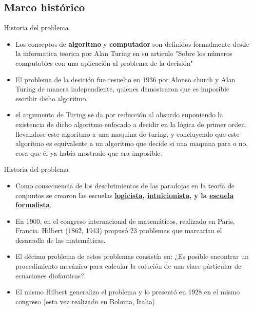 \documentclass{beamer}
\begin{document}
\subsection{Marco histórico}
\begin{frame}{Historia del problema}
    \begin{itemize}
        \item Los conceptos de \textbf{algoritmo} y \textbf{computador} son definidos formalmente desde la informatica teorica por Alan Turing en su articulo "Sobre los números computables con una aplicación al problema de la decisión"\pause
        \item El problema de la desición fue resuelto en 1936 por Alonso church y Alan Turing de manera independiente, quienes demostraron que es imposible escribir dicho algoritmo.\pause
        \item el argumento de Turing se da por reducción al absurdo suponiendo la existencia de dicho algoritmo enfocado a decidir en la lógica de primer orden. llevandose este algoritmo a una maquina de turing, y concluyendo que este algoritmo es equivalente a un algoritmo que decide si una maquina para o no, cosa que él ya había mostrado que era imposible.
    \end{itemize}
\end{frame}
\begin{frame}{Historia del problema}
    \begin{itemize}
        \item Como consecuencia de los descbrimientos de las paradojas en la teoría de conjuntos se crearon las escuelas \textbf{\href{https://es.wikipedia.org/wiki/Logicismo}{logicista}, \href{https://es.wikipedia.org/wiki/Intuicionismo}{intuicionista}, y la \href{https://prezi.com/hnyrb4pzgznj/escuela-formalista-y-escuela-antiformalista/}{escuela formalista}}.\pause
        \item En 1900, en el congreso internacional de matemáticos, realizado en Paris, Francia. Hilbert (1862, 1943) propusó 23 problemas que marcarían el desarrolla de las matemáticas.\pause
        \item El décimo problema de estos problemas consistía en: ¿Es posible encontrar un procedimiento mecánico para calcular la solución de una clase párticular de ecuaciones diofanticas?.\pause
        \item El mismo Hilbert generalizo el problema y lo presentó en 1928 en el mismo congreso (esta vez realizado en Bolonia, Italia)\pause
    \end{itemize}
\end{frame}
\end{document}
